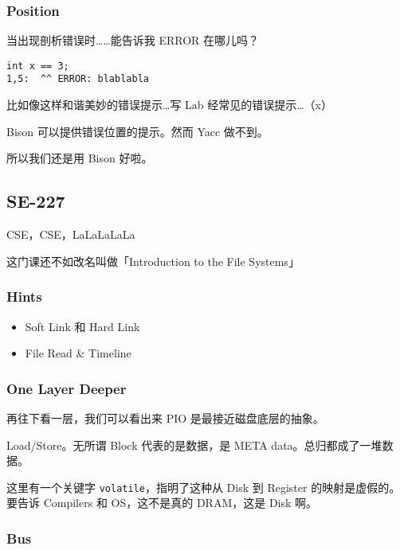 \documentclass[
]{article}
\begin{document}
\hypertarget{header-n122}{%
\subsubsection{Position}\label{header-n122}}

当出现剖析错误时\ldots\ldots 能告诉我 ERROR 在哪儿吗？

\begin{verbatim}
int x == 3;
1,5:  ^^ ERROR: blablabla
\end{verbatim}

比如像这样和谐美妙的错误提示\ldots 写 Lab 经常见的错误提示\ldots（x）

Bison 可以提供错误位置的提示。然而 Yacc 做不到。

所以我们还是用 Bison 好啦。

\hypertarget{header-n128}{%
\subsection{SE-227}\label{header-n128}}

CSE，CSE，LaLaLaLaLa

这门课还不如改名叫做「Introduction to the File Systems」

\hypertarget{header-n131}{%
\subsubsection{Hints}\label{header-n131}}

\begin{itemize}
\item
  Soft Link 和 Hard Link
\item
  File Read \& Timeline
\end{itemize}

\hypertarget{header-n137}{%
\subsubsection{One Layer Deeper}\label{header-n137}}

再往下看一层，我们可以看出来 PIO 是最接近磁盘底层的抽象。

Load/Store。无所谓 Block 代表的是数据，是 META
data。总归都成了一堆数据。

这里有一个关键字 \texttt{volatile}，指明了这种从 Disk 到 Register
的映射是虚假的。要告诉 Compilers 和 OS，这不是真的 DRAM，这是 Disk 啊。

\hypertarget{header-n141}{%
\subsubsection{Bus}\label{header-n141}}
\end{document}
